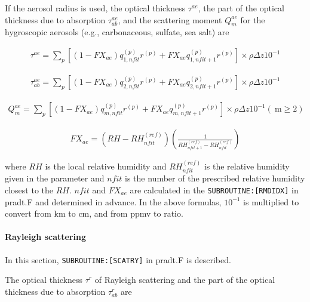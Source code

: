 If the aerosol radius is used, the optical thickness \(\tau^{a e}\), the part of the optical thickness due to absorption \(\tau_{ab}^{a e}\), and the scattering moment \(Q_{m}^{a e}\) for the
hygroscopic aerosols (e.g., carbonaceous, sulfate, sea salt) are

\begin{eqnarray}
\tau^{a e}=\sum_{p}\left[\left(1-F X_{a e}\right) q_{1, n f i t}^{(p)} r^{(p)}+F X_{a e} q_{1, n f i t+1}^{(p)} r^{(p)}\right] \times \rho \Delta z 10^{-1}
\end{eqnarray}

\begin{eqnarray}
\tau_{ab}^{a e}=\sum_{p}\left[\left(1-F X_{a e}\right) q_{2, n f i t}^{(p)} r^{(p)}+F X_{a e} q_{2, n f i t+1}^{(p)} r^{(p)}\right] \times \rho \Delta z 10^{-1}
\end{eqnarray}

\begin{eqnarray}
Q_{m}^{a e}=\sum_{p}\left[\left(1-F X_{a e}\right) q_{m, n f i t}^{(p)} r^{(p)}+F X_{a e} q_{m, n f i t+1}^{(p)} r^{(p)}\right] \times \rho \Delta z 10^{-1}(\mathrm{~m} \geq 2)
\end{eqnarray}

\begin{eqnarray}
F X_{a e}=\left(R H-R H_{n f i t}^{(r e f)}\right)\left(\frac{1}{R H_{n f i t+1}^{(r e f)}-R H_{n f i t}^{(r e f)}}\right)
\end{eqnarray}

where \(RH\) is the local relative humidity and \(R H_{n f i t}^{(r e f)}\) is the relative humidity given in the parameter and \(nfit\) is the number of the prescribed relative humidity closest to
the \(RH\). \(nfit\) and \(FX_{ae}\) are calculated in the \texttt{SUBROUTINE:{[}RMDIDX{]}} in pradt.F and determined in advance. In the above formulas, \(10^{-1}\) is multiplied to convert from
\(\mathrm{km}\) to \(\mathrm{cm}\), and from ppmv to ratio.

\hypertarget{rayleigh-scattering}{%
\paragraph{Rayleigh scattering}\label{rayleigh-scattering}}

In this section, \texttt{SUBROUTINE:{[}SCATRY{]}} in pradt.F is described.

The optical thickness \(\tau^{r}\) of Rayleigh scattering and the part of the optical thickness due to absorption \(\tau_{ab}^{r}\) are

